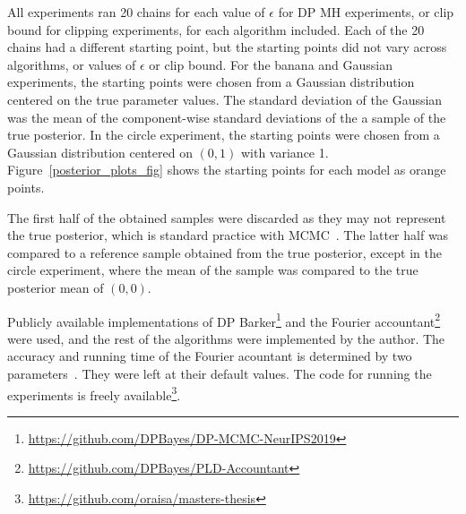 \documentclass[english,twoside,openright]{HYgraduMLDS}
\begin{document}
All experiments ran 20 chains for each value
of \(\epsilon\) for DP MH experiments, or clip bound for clipping experiments,
for each algorithm included. Each of the 20 chains had a different starting point,
but the starting points did
not vary across algorithms, or values of \(\epsilon\) or clip bound.
For the banana and Gaussian experiments, the starting points were chosen
from a Gaussian distribution centered on the true parameter values. The standard
deviation of the Gaussian was the mean of the component-wise standard deviations
of the a sample of the true posterior. In the circle experiment, the starting points
were chosen from a Gaussian distribution centered on \((0, 1)\) with
variance 1. Figure~\ref{posterior_plots_fig} shows the starting points for
each model as orange points.

The first half of the obtained samples were discarded as they may not represent
the true posterior, which is standard practice with MCMC~\cite{BDA}. The
latter half was compared to a reference sample obtained from the true posterior,
except in the circle experiment, where the mean of the sample was compared to
the true posterior mean of \((0,0)\).

Publicly available implementations of DP
Barker\footnote{\url{https://github.com/DPBayes/DP-MCMC-NeurIPS2019}}
and the Fourier
accountant\footnote{\url{https://github.com/DPBayes/PLD-Accountant}} were
used, and the rest of the algorithms were implemented by the author.
The accuracy and running time of the Fourier acountant is
determined by two parameters~\cite{KJH20}. They were left at their default values.
The code for running the experiments is freely
available\footnote{\url{https://github.com/oraisa/masters-thesis}}.


\end{document}
